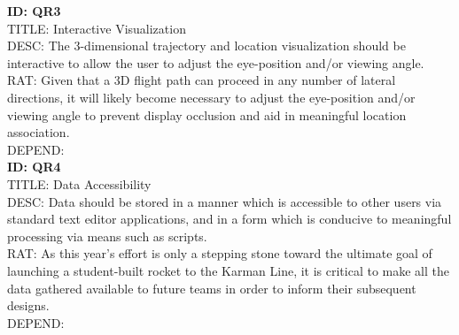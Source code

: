 \documentclass[onecolumn, draftclsnofoot,10pt, compsoc]{IEEEtran}
\begin{document}
			\noindent
			\textbf{ID: QR3}\\
			TITLE: Interactive Visualization\\
			DESC: The 3-dimensional trajectory and location visualization should be interactive to allow the user to adjust the eye-position and/or viewing angle.\\
			RAT: Given that a 3D flight path can proceed in any number of lateral directions, it will likely become necessary to adjust the eye-position and/or viewing angle to prevent display occlusion and aid in meaningful location association.\\
			DEPEND: \\
			
			\noindent
			\textbf{ID: QR4}\\
			TITLE: Data Accessibility\\
			DESC: Data should be stored in a manner which is accessible to other users via standard text editor applications, and in a form which is conducive to meaningful processing via means such as scripts.\\
			RAT: As this year's effort is only a stepping stone toward the ultimate goal of launching a student-built rocket to the Karman Line, it is critical to make all the data gathered available to future teams in order to inform their subsequent designs.\\
			DEPEND: \\

\end{document}
